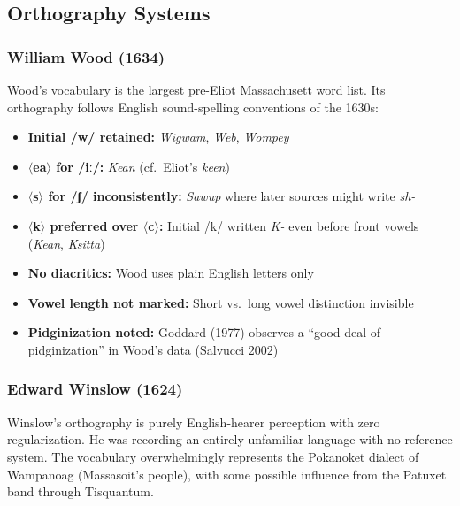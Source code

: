 \subsection{Orthography Systems}

\subsubsection{William Wood (1634)}

Wood's vocabulary is the largest pre-Eliot Massachusett word list. Its
orthography follows English sound-spelling conventions of the 1630s:

\begin{itemize}
  \item \textbf{Initial /w/ retained:} \emph{Wigwam}, \emph{Web}, \emph{Wompey}
  \item \textbf{$\langle$ea$\rangle$ for /iː/:} \emph{Kean} (cf.\ Eliot's \emph{keen})
  \item \textbf{$\langle$s$\rangle$ for /ʃ/ inconsistently:} \emph{Sawup} where
    later sources might write \emph{sh-}
  \item \textbf{$\langle$k$\rangle$ preferred over $\langle$c$\rangle$:}
    Initial /k/ written \emph{K-} even before front vowels (\emph{Kean},
    \emph{Ksitta})
  \item \textbf{No diacritics:} Wood uses plain English letters only
  \item \textbf{Vowel length not marked:} Short vs.\ long vowel distinction
    invisible
  \item \textbf{Pidginization noted:} Goddard (1977) observes a ``good deal of
    pidginization'' in Wood's data (Salvucci 2002)
\end{itemize}

\subsubsection{Edward Winslow (1624)}

Winslow's orthography is purely English-hearer perception with zero
regularization. He was recording an entirely unfamiliar language with no
reference system. The vocabulary overwhelmingly represents the Pokanoket
dialect of Wampanoag (Massasoit's people), with some possible influence from
the Patuxet band through Tisquantum.

